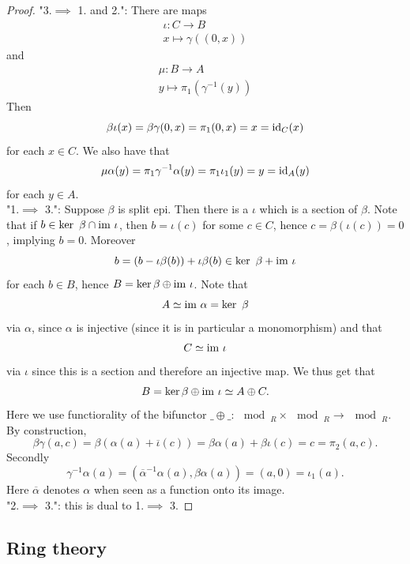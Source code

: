 \begin{proof}
    "3.$\implies$ 1. and 2.": There are maps 
    \begin{gather*}
        \iota: C\rightarrow B\\
        x\mapsto \gamma((0,x))
    \end{gather*}
    and 
    \begin{gather*}
        \mu : B\rightarrow A\\
        y\mapsto \pi_1(\gamma^{-1}(y))
    \end{gather*}
    Then 
    $$
        \beta\iota(x)= \beta\gamma(0,x) = \pi_1(0,x)=x = \mathrm{id}_C(x)
    $$
    for each $x\in C$. We also have that 
    $$
        \mu\alpha(y)=\pi_1\gamma^{-1}\alpha(y) = \pi_1\iota_1(y) = y = \mathrm{id}_A(y) 
    $$
    for each $y\in A$.\\ 
    "1.$\implies$ 3.": Suppose $\beta$ is split epi. Then there is a $\iota$ which is a section of $\beta$. Note that if  $b\in \ker \ \beta \cap \im \ \iota$, then $b=\iota(c)$ for some $c\in C$, hence $c=\beta(\iota(c)) =0$, implying $b=0$. Moreover 
    $$
        b= (b-\iota\beta(b))+\iota\beta(b)\in \ker\ \beta + \mathrm{im}\ \iota 
    $$
    for each $b\in B$, hence $B=\ker\beta \oplus \mathrm{im} \ \iota$.
    Note that 
    $$
        A\simeq \im\ \alpha  =\ker\ \beta 
    $$ 
    via $\alpha$, since $\alpha$ is injective (since it is in particular a monomorphism) and that 
    $$
        C\simeq \mathrm{im} \ \iota 
    $$
    via $\iota$ since this is a section and therefore an injective map. We thus get that 
    $$
        B = \ker \beta \oplus \mathrm{im}\ \iota \simeq A \oplus C.
    $$ 
    Here we use functiorality of the bifunctor $\_\oplus\_ : \mod_R \times \mod_R \rightarrow \mod_R$.\\
    By construction, 
    $$
        \beta\gamma(a,c)= \beta(\alpha(a)+\overline{\iota}(c)) = \beta\alpha(a)+\beta\iota(c)= c = \pi_2(a,c).
    $$
    Secondly 
    $$
        \gamma^{-1}\alpha(a)= (\overline{\alpha}^{-1}\alpha(a),\beta\alpha(a))= (a,0) = \iota_1(a).
    $$
    Here $\overline{\alpha}$ denotes $\alpha$ when seen as a function onto its image.\\ 
    "2.$\implies$ 3.": this is dual to 1.$\implies$ 3.   
\end{proof}

\subsection{Ring theory}
